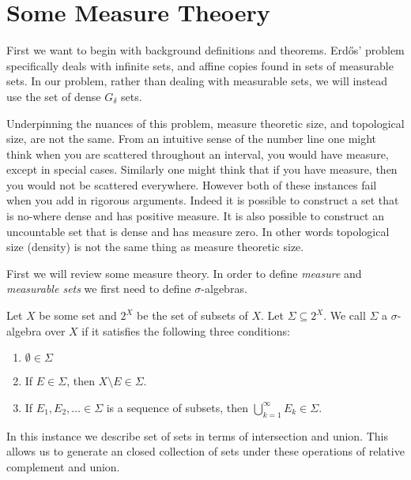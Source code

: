 \section{Some Measure Theoery}

First we want to begin with background definitions and theorems.  Erd\H{o}s' problem specifically deals with infinite sets, and affine copies found in sets of measurable sets.  In our problem, rather than dealing with measurable sets, we will instead use the set of dense $G_\delta$ sets.  

Underpinning the nuances of this problem, measure theoretic size, and topological size, are not the same. From an intuitive sense of the number line one might think when you are scattered throughout an interval, you would have measure, except in special cases. Similarly one might think that if you have measure, then you would not be scattered everywhere.  However both of these instances fail when you add in rigorous arguments.  Indeed it is possible to construct a set that is no-where dense and has positive measure.  It is also possible to construct an uncountable set that is dense and has measure zero.
 In other words topological size (density) is not the same thing as measure theoretic size. 

First we will review some measure theory.  In order to define \textit{measure} and \textit{measurable sets} we first need to define $\sigma$\hyphen{algebras.}   



\begin{definition}
    Let $X$ be some set and $2^X$ be the set of subsets of $X$. Let $\Sigma \subseteq 2^X$. We call $\Sigma$ a $\sigma$\hyphen{algebra} over $X$ if it satisfies the following three conditions:
    \begin{enumerate}
        \item $\emptyset \in \Sigma$
        \item If $E \in \Sigma$, then $X\setminus E \in \Sigma$. 
        \item If $E_1, E_2, \dots \in \Sigma$ is a sequence of subsets, then $\bigcup_{k=1}^\infty E_k \in \Sigma$. 
    \end{enumerate}
\end{definition}

In this instance we describe set of sets in terms of intersection and union.  This allows us to generate an closed collection of sets under these operations of relative complement and union.  

